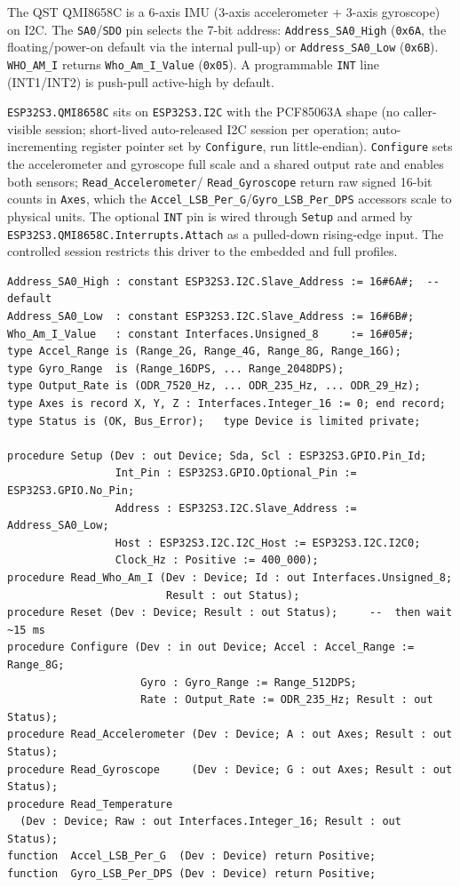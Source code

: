 The QST QMI8658C is a 6-axis IMU (3-axis accelerometer + 3-axis gyroscope) on I2C.
The \texttt{SA0}/\texttt{SDO} pin selects the 7-bit address:
\texttt{Address\_SA0\_High} (\texttt{0x6A}, the floating/power-on default via the
internal pull-up) or \texttt{Address\_SA0\_Low} (\texttt{0x6B}).
\texttt{WHO\_AM\_I} returns \texttt{Who\_Am\_I\_Value} (\texttt{0x05}). A
programmable \texttt{INT} line (INT1/INT2) is push-pull active-high by default.

\texttt{ESP32S3.QMI8658C} sits on \texttt{ESP32S3.I2C} with the PCF85063A shape (no
caller-visible session; short-lived auto-released I2C session per operation;
auto-incrementing register pointer set by \texttt{Configure}, run little-endian).
\texttt{Configure} sets the accelerometer and gyroscope full scale and a shared
output rate and enables both sensors; \texttt{Read\_Accelerometer}/%
\texttt{Read\_Gyroscope} return raw signed 16-bit counts in \texttt{Axes}, which
the \texttt{Accel\_LSB\_Per\_G}/\texttt{Gyro\_LSB\_Per\_DPS} accessors scale to
physical units. The optional \texttt{INT} pin is wired through \texttt{Setup} and
armed by \texttt{ESP32S3.QMI8658C.Interrupts.Attach} as a pulled-down rising-edge
input. The controlled session restricts this driver to the embedded and full
profiles.

\begin{lstlisting}
Address_SA0_High : constant ESP32S3.I2C.Slave_Address := 16#6A#;  --  default
Address_SA0_Low  : constant ESP32S3.I2C.Slave_Address := 16#6B#;
Who_Am_I_Value   : constant Interfaces.Unsigned_8     := 16#05#;
type Accel_Range is (Range_2G, Range_4G, Range_8G, Range_16G);
type Gyro_Range  is (Range_16DPS, ... Range_2048DPS);
type Output_Rate is (ODR_7520_Hz, ... ODR_235_Hz, ... ODR_29_Hz);
type Axes is record X, Y, Z : Interfaces.Integer_16 := 0; end record;
type Status is (OK, Bus_Error);   type Device is limited private;

procedure Setup (Dev : out Device; Sda, Scl : ESP32S3.GPIO.Pin_Id;
                 Int_Pin : ESP32S3.GPIO.Optional_Pin := ESP32S3.GPIO.No_Pin;
                 Address : ESP32S3.I2C.Slave_Address := Address_SA0_Low;
                 Host : ESP32S3.I2C.I2C_Host := ESP32S3.I2C.I2C0;
                 Clock_Hz : Positive := 400_000);
procedure Read_Who_Am_I (Dev : Device; Id : out Interfaces.Unsigned_8;
                         Result : out Status);
procedure Reset (Dev : Device; Result : out Status);     --  then wait ~15 ms
procedure Configure (Dev : in out Device; Accel : Accel_Range := Range_8G;
                     Gyro : Gyro_Range := Range_512DPS;
                     Rate : Output_Rate := ODR_235_Hz; Result : out Status);
procedure Read_Accelerometer (Dev : Device; A : out Axes; Result : out Status);
procedure Read_Gyroscope     (Dev : Device; G : out Axes; Result : out Status);
procedure Read_Temperature
  (Dev : Device; Raw : out Interfaces.Integer_16; Result : out Status);
function  Accel_LSB_Per_G  (Dev : Device) return Positive;
function  Gyro_LSB_Per_DPS (Dev : Device) return Positive;
\end{lstlisting}

